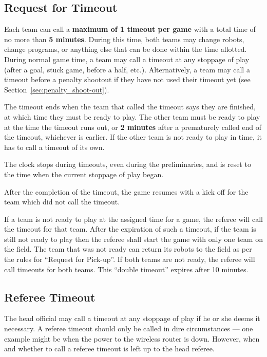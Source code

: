 \documentclass[12pt]{article}
\newcommand{\cf}{see\xspace}
\begin{document}
\subsection{Request for Timeout}
\label{sec:request_for_timeout}

Each team can call a \textbf{maximum of 1 timeout per game} with a total time of no more than \textbf{5 minutes}. During this time, both teams may change robots, change programs, or anything else that can be done within the time allotted.  During normal game time, a team may call a timeout at any stoppage of play (after a goal, stuck game, before a half, etc.). Alternatively, a team may call a timeout before a penalty shootout if they have not used their timeout yet (\cf Section~\ref{sec:penalty_shoot-out}).

The timeout ends when the team that called the timeout says they are finished, at which time they must be ready to play. The other team must be ready to play at the time the timeout runs out, or \textbf{2 minutes} after a prematurely called end of the timeout, whichever is earlier. If the other team is not ready to play in time, it has to call a timeout of its own.

The clock stops during timeouts, even during the preliminaries, and is reset to the time when the current stoppage of play began.

After the completion of the timeout, the game resumes with a kick off for the team which did not call the timeout.

If a team is not ready to play at the assigned time for a game, the referee will call the timeout for that team. After the expiration of such a timeout, if the team is still not ready to play then the referee shall start the game with only one team on the field.  The team that was not ready can return its robots to the field as per the rules for ``Request for Pick-up''. If both teams are not ready, the referee will call timeouts for both teams. This ``double timeout'' expires after 10 minutes.

\subsection{Referee Timeout}
\label{sec:referee_timeout}
The head official may call a timeout at any stoppage of play if he or she deems it necessary.  A referee timeout should only be called in dire circumstances --- one example might be when the power to the wireless router is down.  However, when and whether to call a referee timeout is left up to the head referee.
\end{document}
